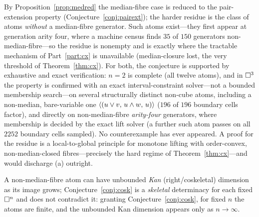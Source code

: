 \begin{rem}[Status]
  By Proposition~\ref{prop:medred} the median-fibre case is reduced to the
  pair-extension property (Conjecture~\ref{conj:pairext}); the harder
  residue is the class of atoms \emph{without} a median-fibre generator.
  Such atoms exist---they first appear at generation arity four, where a
  machine census finds $35$ of $150$ generators non-median-fibre---so the
  residue is nonempty and is exactly where the tractable mechanism of
  Part~\ref{part:cx} is unavailable (median-closure lost, the very
  threshold of Theorem~\ref{thm:cx}).  For both, the conjecture is
  supported by exhaustive and exact verification: $n=2$ is complete (all
  twelve atoms),
  and in $\square^3$ the property is confirmed with an exact
  interval-constraint solver---not a bounded membership search---on
  several structurally distinct non-cube atoms, including a non-median,
  bare-variable one $\langle (u\vee v,\,u\wedge w,\,u) \rangle$ ($196$ of $196$
  boundary cells factor), and directly on non-median-fibre \emph{arity-four}
  generators, where membership is decided by the exact lift solver
  (a further such atom passes on all $2252$ boundary cells sampled).  No
  counterexample has ever appeared.  A proof for the residue is a
  local-to-global principle for monotone lifting with order-convex,
  non-median-closed fibres---precisely the hard regime of
  Theorem~\ref{thm:cx}---and would discharge \textup{(a)} outright.
\end{rem}

\begin{rem}
  A non-median-fibre atom can have unbounded \emph{Kan} (right/coskeletal)
  dimension~\cite{PaperW} as its image grows; Conjecture~\ref{conj:cosk}
  is a \emph{skeletal} determinacy for each fixed $\square^n$ and does not
  contradict it: granting Conjecture~\ref{conj:cosk}, for fixed $n$ the
  atoms are finite, and the unbounded Kan dimension appears only as
  $n\to\infty$.
\end{rem}
